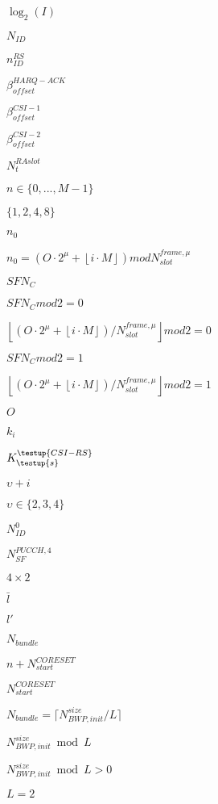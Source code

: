 \documentclass{article}
\begin{document}
$\log_2(I)$
\pagebreak

$N_{ID}$
\pagebreak

$n_{ID}^{RS}$
\pagebreak

$\beta^{HARQ-ACK}_{offset}$
\pagebreak

$\beta^{CSI-1}_{offset}$
\pagebreak

$\beta^{CSI-2}_{offset}$
\pagebreak

$N^{RAslot}_t$
\pagebreak

$n \in \{0,...,M-1\}$
\pagebreak

$\{1,2,4,8\}$
\pagebreak

$n_0$
\pagebreak

$n_0=\left (O\cdot 2^\mu + \left \lfloor
i\cdot M \right \rfloor \right )mod N_{slot}^{frame,\mu}$
\pagebreak

$SFN_C$
\pagebreak

$SFN_C mod 2 = 0$
\pagebreak

$\left \lfloor \left ( O \cdot 2^\mu + \left \lfloor i\cdot M \right \rfloor \right )
  / N_{slot}^{frame,\mu}\right \rfloor mod 2 = 0$
\pagebreak

$SFN_C mod 2 = 1$
\pagebreak

$\left \lfloor \left ( O \cdot 2^\mu + \left \lfloor i\cdot M \right \rfloor \right )
  / N_{slot}^{frame,\mu}\right \rfloor mod 2 = 1$
\pagebreak

$O$
\pagebreak

$k_i$
\pagebreak

$K^\testup{CSI-RS}_\testup{s}$
\pagebreak

$\upsilon + i$
\pagebreak

$\upsilon \in \{2,3,4\}$
\pagebreak

$N_{ID}^0$
\pagebreak

$N_{SF}^{PUCCH,4}$
\pagebreak

$4 \times 2$
\pagebreak

$\bar{l}$
\pagebreak

$l'$
\pagebreak

$N_{bundle}$
\pagebreak

$n + N_{start}^{CORESET}$
\pagebreak

$N_{start}^{CORESET}$
\pagebreak

$N_{bundle}=\lceil N_{BWP,init}^{size}/L \rceil$
\pagebreak

$N_{BWP,init}^{size} \bmod L$
\pagebreak

$N_{BWP,init}^{size} \bmod L > 0$
\pagebreak

$L=2$
\pagebreak
\end{document}
